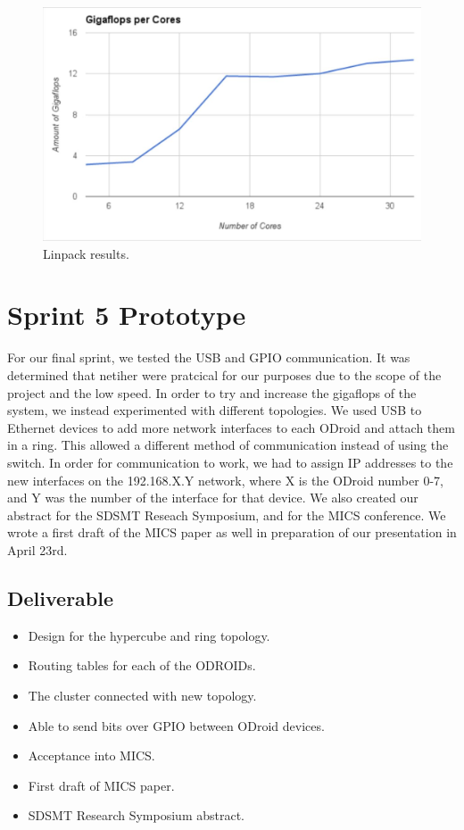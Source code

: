 \begin{figure}[h]
	\caption{Linpack results.}
	\centering
		\includegraphics[scale=0.5]{minimalgraph.JPG}
\end{figure}

\section{Sprint 5 Prototype}

For our final sprint, we tested the USB and GPIO communication. It was determined that netiher were pratcical for our purposes due to the scope of the project and the low speed. In order to try and increase the gigaflops of the system, we instead experimented with different topologies. We used USB to Ethernet devices to add more network interfaces to each ODroid and attach them in a ring. This allowed a different method of communication instead of using the switch. In order for communication to work, we had to assign IP addresses to the new interfaces on the 192.168.X.Y network, where X is the ODroid number 0-7, and Y was the number of the interface for that device. We also created our abstract for the SDSMT Reseach Symposium, and for the MICS conference. We wrote a first draft of the MICS paper as well in preparation of our presentation in April 23rd. 

\subsection{Deliverable}

\begin{itemize}
\item Design for the hypercube and ring topology.
\item Routing tables for each of the ODROIDs.
\item The cluster connected with new topology.
\item Able to send bits over GPIO between ODroid devices.
\item Acceptance into MICS.
\item First draft of MICS paper.
\item SDSMT Research Symposium abstract.
\end{itemize}

